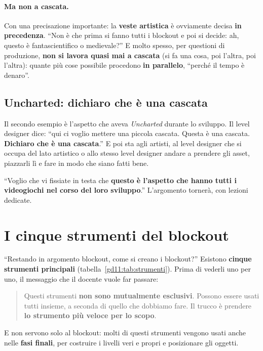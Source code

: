 \paragraph{Ma non a cascata.} Con una precisazione importante: la \textbf{veste
artistica} è ovviamente decisa \textbf{in precedenza}. ``Non è che prima si
fanno tutti i blockout e poi si decide: ah, questo è fantascientifico o
medievale?'' E molto spesso, per questioni di produzione, \textbf{non si lavora
quasi mai a cascata} (si fa una cosa, poi l'altra, poi l'altra): quante più
cose possibile procedono \textbf{in parallelo}, ``perché il tempo è denaro''.

\subsection{Uncharted: dichiaro che è una cascata}

Il secondo esempio è l'aspetto che aveva \emph{Uncharted} durante lo sviluppo.
Il level designer dice: ``qui ci voglio mettere una piccola cascata. Questa è
una cascata. \textbf{Dichiaro che è una cascata}.'' E poi sta agli artisti, al
level designer che si occupa del lato artistico o allo stesso level designer
andare a prendere gli asset, piazzarli lì e fare in modo che siano fatti bene.

``Voglio che vi fissiate in testa che \textbf{questo è l'aspetto che hanno tutti
i videogiochi nel corso del loro sviluppo}.'' L'argomento tornerà, con lezioni
dedicate.

\section{I cinque strumenti del blockout}
\label{gd11:sec:strumenti}



``Restando in argomento blockout, come si creano i blockout?'' Esistono
\textbf{cinque strumenti principali} (tabella~\ref{gd11:tab:strumenti}). Prima
di vederli uno per uno, il messaggio che il docente vuole far passare:
\begin{quote}
Questi strumenti \textbf{non sono mutualmente esclusivi}. Possono essere usati
tutti insieme, a seconda di quello che dobbiamo fare. Il trucco è prendere
\textbf{lo strumento più veloce per lo scopo}.
\end{quote}
E non servono solo al blockout: molti di questi strumenti vengono usati anche
nelle \textbf{fasi finali}, per costruire i livelli veri e propri e
posizionare gli oggetti.

